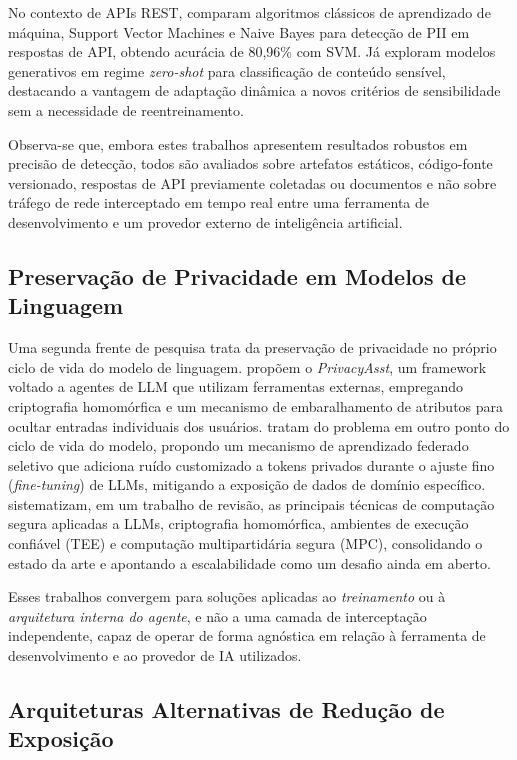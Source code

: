 No contexto de APIs REST,  comparam algoritmos clássicos de aprendizado de máquina, Support Vector Machines e Naive Bayes para detecção de PII em respostas de API, obtendo acurácia de 80,96\% com SVM. Já  exploram modelos generativos em regime \textit{zero-shot} para classificação de conteúdo sensível, destacando a vantagem de adaptação dinâmica a novos critérios de sensibilidade sem a necessidade de reentreinamento.

Observa-se que, embora estes trabalhos apresentem resultados robustos em precisão de detecção, todos são avaliados sobre artefatos estáticos, código-fonte versionado, respostas de API previamente coletadas ou documentos e não sobre tráfego de rede interceptado em tempo real entre uma ferramenta de desenvolvimento e um provedor externo de inteligência artificial.

\subsection{Preservação de Privacidade em Modelos de Linguagem}

Uma segunda frente de pesquisa trata da preservação de privacidade no próprio ciclo de vida do modelo de linguagem.  propõem o \textit{PrivacyAsst}, um framework voltado a agentes de LLM que utilizam ferramentas externas, empregando criptografia homomórfica e um mecanismo de embaralhamento de atributos para ocultar entradas individuais dos usuários.  tratam do problema em outro ponto do ciclo de vida do modelo, propondo um mecanismo de aprendizado federado seletivo que adiciona ruído customizado a tokens privados durante o ajuste fino (\textit{fine-tuning}) de LLMs, mitigando a exposição de dados de domínio específico.  sistematizam, em um trabalho de revisão, as principais técnicas de computação segura aplicadas a LLMs, criptografia homomórfica, ambientes de execução confiável (TEE) e computação multipartidária segura (MPC), consolidando o estado da arte e apontando a escalabilidade como um desafio ainda em aberto.

Esses trabalhos convergem para soluções aplicadas ao \textit{treinamento} ou à \textit{arquitetura interna do agente}, e não a uma camada de interceptação independente, capaz de operar de forma agnóstica em relação à ferramenta de desenvolvimento e ao provedor de IA utilizados.

\subsection{Arquiteturas Alternativas de Redução de Exposição}

